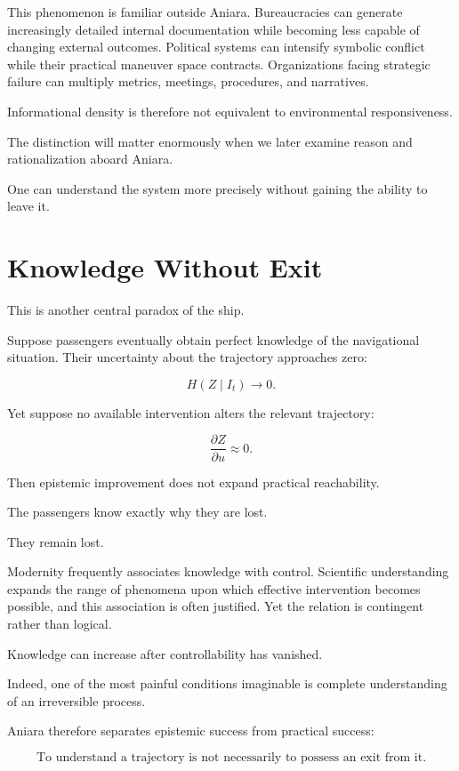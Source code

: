 \documentclass[11pt,oneside]{book}
\theoremstyle{definition}
\theoremstyle{remark}
\begin{document}
This phenomenon is familiar outside Aniara. Bureaucracies can generate increasingly detailed internal documentation while becoming less capable of changing external outcomes. Political systems can intensify symbolic conflict while their practical maneuver space contracts. Organizations facing strategic failure can multiply metrics, meetings, procedures, and narratives.

Informational density is therefore not equivalent to environmental responsiveness.

The distinction will matter enormously when we later examine reason and rationalization aboard Aniara.

One can understand the system more precisely without gaining the ability to leave it.

\section{Knowledge Without Exit}

This is another central paradox of the ship.

Suppose passengers eventually obtain perfect knowledge of the navigational situation. Their uncertainty about the trajectory approaches zero:

\[
H(Z\mid I_t)\rightarrow0.
\]

Yet suppose no available intervention alters the relevant trajectory:

\[
\frac{\partial Z}{\partial u}\approx0.
\]

Then epistemic improvement does not expand practical reachability.

The passengers know exactly why they are lost.

They remain lost.

Modernity frequently associates knowledge with control. Scientific understanding expands the range of phenomena upon which effective intervention becomes possible, and this association is often justified. Yet the relation is contingent rather than logical.

Knowledge can increase after controllability has vanished.

Indeed, one of the most painful conditions imaginable is complete understanding of an irreversible process.

Aniara therefore separates epistemic success from practical success:

\[
\boxed{
\text{To understand a trajectory is not necessarily to possess an exit from it.}
}
\]
\end{document}
